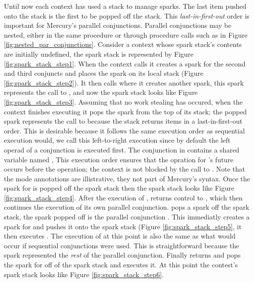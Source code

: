 Until now each context has used a stack to manage sparks.
The last item pushed onto the stack is the first to be popped off the
stack.
This \emph{last-in-first-out} order is important for Mercury's parallel
conjunctions.
Parallel conjunctions may be nested, either in the same procedure or through
procedure calls such as in Figure
\ref{fig:nested_par_conjunctions}.
Consider a context whose spark stack's contents are initially undefined,
the spark stack is represented by
Figure \ref{fig:spark_stack_step1}.
When the context calls  it creates a spark 
for the second and third conjuncts 
and places the spark on its local stack (Figure
\ref{fig:spark_stack_step2}).
It then calls  where it creates another spark,
this spark represents the call to ,
and now the spark stack looks like
Figure \ref{fig:spark_stack_step3}.
Assuming that no work stealing has occured,
when the context finishes executing  it pops the spark from the top
of its stack;
the popped spark represents the call to  because
the stack returns items in a last-in-first-out order.
This is desirable because it follows the same execution order as sequential
execution would,
we call this left-to-right execution since by default the left operad of a
conjunction is executed first.
The conjunction in  contains a shared variable named ,
This execution order ensures that the \signal opration for 's future
occurs before the \wait operation;
the context is not blocked by the call to \wait.
Note that the mode annotations are illistrative,
they not part of Mercury's syntax.
Once the spark for  is popped off the spark stack then the spark
stack looks like Figure \ref{fig:spark_stack_step4}.
After the execution of ,  returns control to ,
which then continues the execution of its own parallel conjunction.
 pops a spark off the spark stack,
the spark popped off is the parallel conjunction
.
This immediatly creates a spark for  and pushes it onto the spark
stack (Figure \ref{fig:spark_stack_step5},
it then executes .
The execution of  at this point is also the same as what would occur
if sequential conjunctions were used.
This is straightforward because
the spark represented the \emph{rest} of the parallel
conjunction.
Finally  returns and  pops the spark for  off of the
spark stack and executes it.
At this point the contest's spark stack looks like Figure
\ref{fig:spark_stack_step6}.

